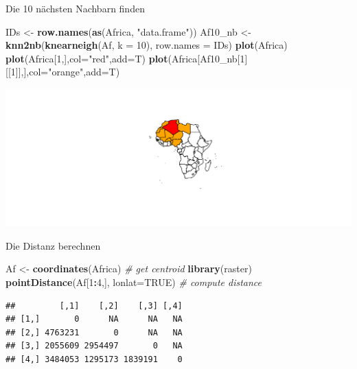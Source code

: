 \documentclass[ignorenonframetext,]{beamer}
\newenvironment{Shaded}{\begin{snugshade}}{\end{snugshade}}
\newcommand{\KeywordTok}[1]{\textcolor[rgb]{0.13,0.29,0.53}{\textbf{#1}}}
\newcommand{\DataTypeTok}[1]{\textcolor[rgb]{0.13,0.29,0.53}{#1}}
\newcommand{\DecValTok}[1]{\textcolor[rgb]{0.00,0.00,0.81}{#1}}
\newcommand{\StringTok}[1]{\textcolor[rgb]{0.31,0.60,0.02}{#1}}
\newcommand{\CommentTok}[1]{\textcolor[rgb]{0.56,0.35,0.01}{\textit{#1}}}
\newcommand{\OtherTok}[1]{\textcolor[rgb]{0.56,0.35,0.01}{#1}}
\newcommand{\OperatorTok}[1]{\textcolor[rgb]{0.81,0.36,0.00}{\textbf{#1}}}
\newcommand{\NormalTok}[1]{#1}
\begin{document}
\begin{frame}[fragile]{Die 10 nächsten Nachbarn finden}

\begin{Shaded}
\begin{Highlighting}[]
\NormalTok{IDs <-}\StringTok{ }\KeywordTok{row.names}\NormalTok{(}\KeywordTok{as}\NormalTok{(Africa, }\StringTok{"data.frame"}\NormalTok{))}
\NormalTok{Af10_nb <-}\StringTok{ }\KeywordTok{knn2nb}\NormalTok{(}\KeywordTok{knearneigh}\NormalTok{(Af, }\DataTypeTok{k =} \DecValTok{10}\NormalTok{), }\DataTypeTok{row.names =}\NormalTok{ IDs)}
\KeywordTok{plot}\NormalTok{(Africa)}
\KeywordTok{plot}\NormalTok{(Africa[}\DecValTok{1}\NormalTok{,],}\DataTypeTok{col=}\StringTok{"red"}\NormalTok{,}\DataTypeTok{add=}\NormalTok{T)}
\KeywordTok{plot}\NormalTok{(Africa[Af10_nb[}\DecValTok{1}\NormalTok{][[}\DecValTok{1}\NormalTok{]],],}\DataTypeTok{col=}\StringTok{"orange"}\NormalTok{,}\DataTypeTok{add=}\NormalTok{T)}
\end{Highlighting}
\end{Shaded}

\includegraphics{slides_all2gether_part1_files/figure-beamer/unnamed-chunk-171-1.pdf}

\end{frame}

\begin{frame}[fragile]{Die Distanz berechnen}

\begin{Shaded}
\begin{Highlighting}[]
\NormalTok{Af <-}\StringTok{ }\KeywordTok{coordinates}\NormalTok{(Africa) }\CommentTok{# get centroid}
\KeywordTok{library}\NormalTok{(raster)}
\KeywordTok{pointDistance}\NormalTok{(Af[}\DecValTok{1}\OperatorTok{:}\DecValTok{4}\NormalTok{,], }\DataTypeTok{lonlat=}\OtherTok{TRUE}\NormalTok{) }\CommentTok{# compute distance}
\end{Highlighting}
\end{Shaded}

\begin{verbatim}
##         [,1]    [,2]    [,3] [,4]
## [1,]       0      NA      NA   NA
## [2,] 4763231       0      NA   NA
## [3,] 2055609 2954497       0   NA
## [4,] 3484053 1295173 1839191    0
\end{verbatim}

\end{frame}
\end{document}

